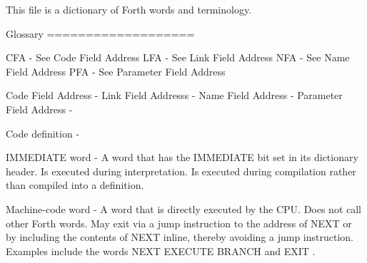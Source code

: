 \documentclass[
    letterpaper, %
	fontsize=10pt, %
	twoside=true, %
	numbers=noenddot, %
]{kaobook}
\begin{document}



\renewcommand{\nomname}{Notation} %
\renewcommand{\nompreamble}{The next list describes several symbols that will be later used within the body of the document.} %






\glsaddall %
\printglossary[title=Glossary, toctitle=Glossary,nonumberlist] %


This file is a dictionary of Forth words and terminology.

Glossary
===================

CFA - See Code Field Address
LFA - See Link Field Address
NFA - See Name Field Address
PFA - See Parameter Field Address

Code Field Address - 
Link Field Addresss - 
Name Field Address - 
Parameter Field Address - 


Code definition - 

IMMEDIATE word - A word that has the IMMEDIATE bit set in its dictionary
    header. Is executed during interpretation. Is executed during 
    compilation rather than compiled into a definition.


Machine-code word - A word that is directly executed by the CPU. Does not 
    call other Forth words. May exit via a jump instruction to the 
    address of NEXT or by including the contents of NEXT inline, thereby 
    avoiding a jump instruction. Examples include the words NEXT EXECUTE 
    BRANCH and EXIT .
\end{document}

